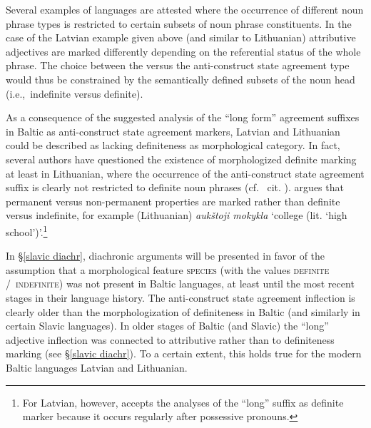 Several examples of languages are attested where the occurrence of different noun phrase types is restricted to certain subsets of noun phrase constituents. In the case of the Latvian example given above (and similar to Lithuanian) attributive adjectives are marked differently depending on the referential status of the whole phrase. The choice between the  versus the anti\hyp{}construct state agreement type would thus be constrained by the semantically defined subsets of the noun head (i.e.,~indefinite versus definite). 

As a consequence of the suggested analysis of the “long form” agreement suffixes in Baltic as anti\hyp{}construct state agreement markers, Latvian and Lithuanian could be described as lacking definiteness as morphological category. In fact, several authors have questioned the existence of morphologized definite marking at least in Lithuanian, where the occurrence of the anti\hyp{}construct state agreement suffix is clearly not restricted to definite noun phrases (cf.~\citealt{wissemann1958} cit. \citealt[181–182]{kramsky1972}). \citet[37]{trost1966} argues that permanent versus non-permanent properties are marked rather than definite versus indefinite, for example (Lithuanian) \textit{aukštoji mokykla} ‘college (lit. ‘high school’)’.\footnote{For Latvian, however, \citet[38]{trost1966} accepts the analyses of the “long” suffix as definite marker because it occurs regularly after possessive pronouns.}

In \S\ref{slavic diachr}, diachronic arguments will be presented in favor of the assumption that a morphological feature \textsc{species} (with the values \textsc{definite} /~\textsc{indefinite}) was not present in Baltic languages, at least until the most recent stages in their language history. The anti\hyp{}construct state agreement inflection is clearly older than the morphologization of definiteness in Baltic (and similarly in certain Slavic languages). In older stages of Baltic (and Slavic) the “long” adjective inflection was connected to attributive rather than to definiteness marking (see \S\ref{slavic diachr}). To a certain extent, this holds true for the modern Baltic languages Latvian and Lithuanian.


